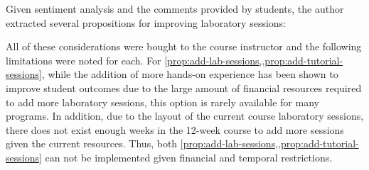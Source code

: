 Given sentiment analysis and the comments provided by students, the author extracted several propositions for improving laboratory sessions: 


All of these considerations were bought to the course instructor and the following limitations were noted for each. For \cref{prop:add-lab-sessions,,prop:add-tutorial-sessions}, while the addition of more hands-on experience has been shown to improve student outcomes\cite{Ristov2011, Stolikj2011} due to the large amount of financial resources required to add more laboratory sessions, this option is rarely available for many programs. In addition, due to the layout of the current course laboratory sessions, there does not exist enough weeks in the 12-week course to add more sessions given the current resources. Thus, both \cref{prop:add-lab-sessions,,prop:add-tutorial-sessions} can not be implemented given financial and temporal restrictions.

